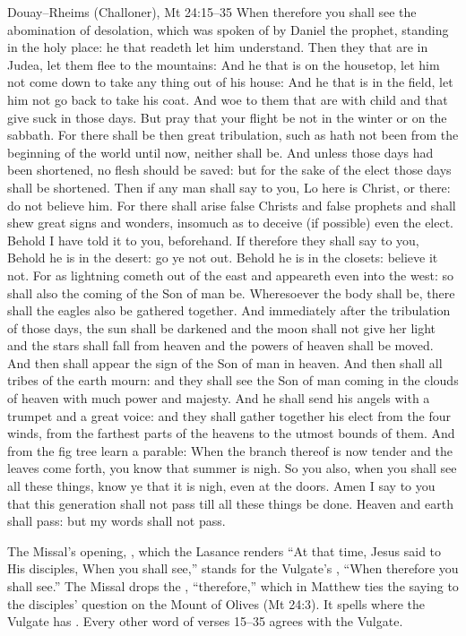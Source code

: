 \begin{englishwitness}{Douay--Rheims (Challoner), Mt 24:15--35}
When therefore you shall see the abomination of desolation, which was spoken
of by Daniel the prophet, standing in the holy place: he that readeth let him
understand. Then they that are in Judea, let them flee to the mountains: And
he that is on the housetop, let him not come down to take any thing out of his
house: And he that is in the field, let him not go back to take his coat. And
woe to them that are with child and that give suck in those days. But pray
that your flight be not in the winter or on the sabbath. For there shall be
then great tribulation, such as hath not been from the beginning of the world
until now, neither shall be. And unless those days had been shortened, no
flesh should be saved: but for the sake of the elect those days shall be
shortened. Then if any man shall say to you, Lo here is Christ, or there: do
not believe him. For there shall arise false Christs and false prophets and
shall shew great signs and wonders, insomuch as to deceive (if possible) even
the elect. Behold I have told it to you, beforehand. If therefore they shall
say to you, Behold he is in the desert: go ye not out. Behold he is in the
closets: believe it not. For as lightning cometh out of the east and appeareth
even into the west: so shall also the coming of the Son of man be. Wheresoever
the body shall be, there shall the eagles also be gathered together. And
immediately after the tribulation of those days, the sun shall be darkened
and the moon shall not give her light and the stars shall fall from heaven and
the powers of heaven shall be moved. And then shall appear the sign of the Son
of man in heaven. And then shall all tribes of the earth mourn: and they shall
see the Son of man coming in the clouds of heaven with much power and majesty.
And he shall send his angels with a trumpet and a great voice: and they shall
gather together his elect from the four winds, from the farthest parts of the
heavens to the utmost bounds of them. And from the fig tree learn a parable:
When the branch thereof is now tender and the leaves come forth, you know that
summer is nigh. So you also, when you shall see all these things, know ye that
it is nigh, even at the doors. Amen I say to you that this generation shall
not pass till all these things be done. Heaven and earth shall pass: but my
words shall not pass.
\end{englishwitness}

\noindent The Missal's opening, , which the Lasance renders ``At that time, Jesus said to
His disciples, When you shall see,'' stands for the Vulgate's , ``When therefore you shall see.'' The Missal drops the
, ``therefore,'' which in Matthew ties the saying to the
disciples' question on the Mount of Olives (Mt 24:3). It spells
 where the Vulgate has . Every other word
of verses 15--35 agrees with the Vulgate.

